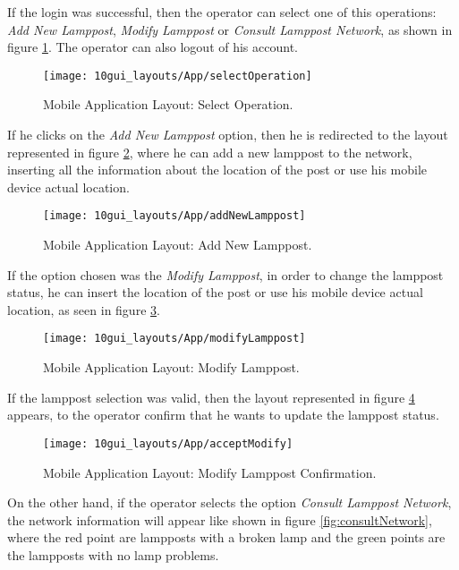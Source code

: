 If the login was successful, then the operator can select one of this operations: \textit{Add New Lamppost}, \textit{Modify Lamppost} or \textit{Consult Lamppost Network}, as shown in figure \ref{fig:selectOperation}. The operator can also logout of his account.

\begin{figure}[H]
	\centering	
	\texttt{[image: 10gui\_layouts/App/selectOperation]}
	\caption{Mobile Application Layout: Select Operation.}
	\label{fig:selectOperation}
\end{figure}

If he clicks on the \textit{Add New Lamppost} option, then he is redirected to the layout represented in figure \ref{fig:addNewLamppost}, where he can add a new lamppost to the network, inserting all the information about the location of the post or use his mobile device actual location. 

\begin{figure}[H]
	\centering	
	\texttt{[image: 10gui\_layouts/App/addNewLamppost]}
	\caption{Mobile Application Layout: Add New Lamppost.}
	\label{fig:addNewLamppost}
\end{figure}

If the option chosen was the \textit{Modify Lamppost}, in order to change the lamppost status, he can insert the location of the post or use his mobile device actual location, as seen in figure \ref{fig:modifyLamppost}.

\begin{figure}[H]
	\centering	
	\texttt{[image: 10gui\_layouts/App/modifyLamppost]}
	\caption{Mobile Application Layout: Modify Lamppost.}
	\label{fig:modifyLamppost}
\end{figure}

If the lamppost selection was valid, then the layout represented in figure \ref{fig:acceptModify} appears, to the operator confirm that he wants to update the lamppost status.

\begin{figure}[H]
	\centering	
	\texttt{[image: 10gui\_layouts/App/acceptModify]}
	\caption{Mobile Application Layout: Modify Lamppost Confirmation.}
	\label{fig:acceptModify}
\end{figure}

On the other hand, if the operator selects the option \textit{Consult Lamppost Network}, the network information will appear like shown in figure \ref{fig:consultNetwork}, where the red point are lampposts with a broken lamp and the green points are the lampposts with no lamp problems.

